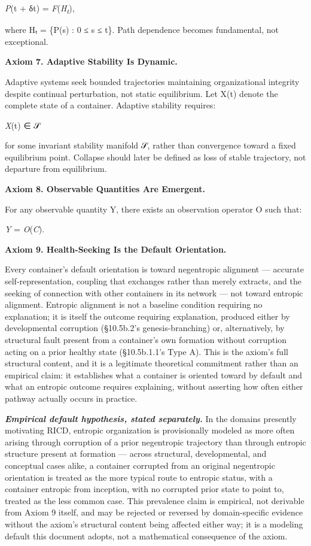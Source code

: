 \documentclass[
]{article}
\begin{document}
\emph{P}(t + δt) = \emph{F}(\emph{H\textsubscript{t}}),

where Hₜ = \{P(s) : 0 ≤ s ≤ t\}. Path dependence becomes fundamental,
not exceptional.

\textbf{Axiom 7. Adaptive Stability Is Dynamic.}

Adaptive systems seek bounded trajectories maintaining organizational
integrity despite continual perturbation, not static equilibrium. Let
X(t) denote the complete state of a container. Adaptive stability
requires:

\emph{X}(t) ∈ 𝒮

for some invariant stability manifold 𝒮, rather than convergence toward
a fixed equilibrium point. Collapse should later be defined as loss of
stable trajectory, not departure from equilibrium.

\textbf{Axiom 8. Observable Quantities Are Emergent.}

For any observable quantity Y, there exists an observation operator O
such that:

\emph{Y} = \emph{O}(\emph{C}).

\textbf{Axiom 9. Health-Seeking Is the Default Orientation.}

Every container's default orientation is toward negentropic alignment
--- accurate self-representation, coupling that exchanges rather than
merely extracts, and the seeking of connection with other containers in
its network --- not toward entropic alignment. Entropic alignment is not
a baseline condition requiring no explanation; it is itself the outcome
requiring explanation, produced either by developmental corruption
(§10.5b.2's genesis-branching) or, alternatively, by structural fault
present from a container's own formation without corruption acting on a
prior healthy state (§10.5b.1.1's Type A). This is the axiom's full
structural content, and it is a legitimate theoretical commitment rather
than an empirical claim: it establishes what a container is oriented
toward by default and what an entropic outcome requires explaining,
without asserting how often either pathway actually occurs in practice.

\emph{\textbf{Empirical default hypothesis, stated separately.}} In the
domains presently motivating RICD, entropic organization is
provisionally modeled as more often arising through corruption of a
prior negentropic trajectory than through entropic structure present at
formation --- across structural, developmental, and conceptual cases
alike, a container corrupted from an original negentropic orientation is
treated as the more typical route to entropic status, with a container
entropic from inception, with no corrupted prior state to point to,
treated as the less common case. This prevalence claim is empirical, not
derivable from Axiom 9 itself, and may be rejected or reversed by
domain-specific evidence without the axiom's structural content being
affected either way; it is a modeling default this document adopts, not
a mathematical consequence of the axiom.
\end{document}
